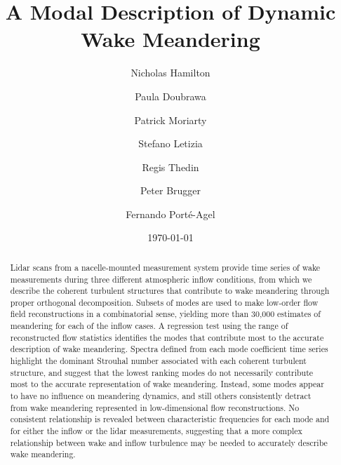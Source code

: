 \documentclass[%
 aip,
 amsmath,amssymb,
preprint,%
]{revtex4-1}
\begin{document}

\title{A Modal Description of Dynamic Wake Meandering}%

\author{Nicholas Hamilton}
\author{Paula Doubrawa}
\author{Patrick Moriarty}
\author{Stefano Letizia}
\author{Regis Thedin}
\author{Peter Brugger}
\author{Fernando Port\'e-Agel}

\date{\today}%

\begin{abstract}
Lidar scans from a nacelle-mounted measurement system provide time series of wake measurements during three different atmospheric inflow conditions, from which we describe the coherent turbulent structures that contribute to wake meandering through proper orthogonal decomposition. 
Subsets of modes are used to make low-order flow field reconstructions in a combinatorial sense, yielding more than 30,000 estimates of meandering for each of the inflow cases.
A regression test using the range of reconstructed flow statistics identifies the modes that contribute most to the accurate description of wake meandering.
Spectra defined from each mode coefficient time series highlight the dominant Strouhal number associated with each coherent turbulent structure, and suggest that the lowest ranking modes do not necessarily contribute most to the accurate representation of wake meandering. 
Instead, some modes appear to have no influence on meandering dynamics, and still others consistently detract from wake meandering represented in low-dimensional flow reconstructions.
No consistent relationship is revealed between characteristic frequencies for each mode and for either the inflow or the lidar measurements, suggesting that a more complex relationship between wake and inflow turbulence may be needed to accurately describe wake meandering.


\end{abstract}
\end{document}
